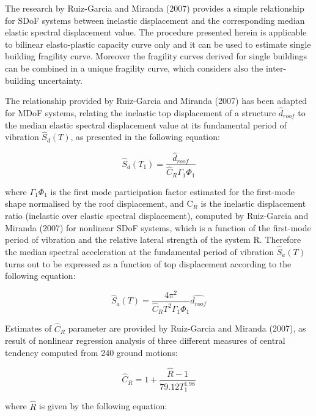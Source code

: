 The research by Ruiz-Garcia and Miranda (2007) provides a simple relationship for SDoF systems between inelastic displacement  and the corresponding median elastic spectral displacement value. The procedure presented herein is applicable to bilinear elasto-plastic capacity curve only and it can be used to estimate single building fragility curve. Moreover the fragility curves derived for single buildings can be combined in a unique fragility curve, which considers also the inter-building uncertainty.

The relationship provided by Ruiz-Garcia and Miranda (2007) has been adapted for MDoF systems, relating the inelastic top displacement of a structure $\hat{d}_{roof}$ to the median elastic spectral displacement value at its fundamental period of vibration $\hat{S}_{d}(T)$, as presented in the following equation:

\begin{equation}
\hat{S}_d(T_1) = \frac{\hat{d}_{roof}}{\hat{C}_R \Gamma_1 \Phi_1} 
\label{eq:basic_DF}
\end{equation}

where $\Gamma_1 \Phi_1$ is the first mode participation factor estimated for the first-mode shape normalised by the roof displacement, and C$_R$ is the inelastic displacement ratio (inelastic over elastic spectral displacement), computed by Ruiz-Garcia and Miranda (2007) for nonlinear SDoF systems, which is a function of the first-mode period of vibration and the relative lateral strength of the system R. Therefore the median spectral acceleration at the fundamental period of vibration $\hat{S}_{a}(T)$ turns out to be expressed as a function of top displacement according to the following equation:

\begin{equation}
\hat{S}_{a}(T) = \frac{4 \pi^2}{\hat{C}_R T^2 \Gamma_1 \Phi_1} \hat{d_{roof}}
\label{eq:Sa_RGM}
\end{equation}

Estimates of $\hat{C}_R$ parameter are provided by Ruiz-Garcia and Miranda (2007), as result of nonlinear regression analysis of three different measures of central tendency computed from 240 ground motions:

\begin{equation}
\hat{C}_R = 1 + \frac{\hat{R} - 1}{79.12 T_1 ^{1.98}}
\label{eq:Cr_RGM}
\end{equation}

where $\hat{R}$ is given by the following equation:

